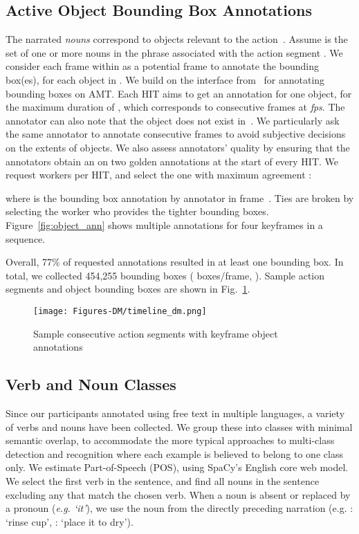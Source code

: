 \documentclass[runningheads]{llncs}
\newcommand{\fps}{\textit{fps}}
\begin{document}
\subsection{Active Object Bounding Box Annotations}
\label{subsec:strongObject}

The narrated \textit{nouns} correspond to objects relevant
to the action~\cite{Lee2012,Damen2014a}. Assume  is the set of one or more nouns in the phrase  associated with the action segment . We consider each frame  within  as a potential frame to annotate the bounding box(es), for each object in . We build on the interface from~\cite{tangseng2017} for annotating bounding boxes on AMT.
Each HIT aims to get an annotation for one object, for the maximum duration of , which corresponds to  consecutive frames at \fps. The annotator can also note that the object does not exist in~. 
We particularly ask the same annotator to annotate consecutive frames to avoid subjective decisions on the extents of objects. We also assess annotators' quality by ensuring that the annotators obtain an  on two golden annotations at the start of every HIT. We request  workers per HIT, and select the one with maximum agreement : 


\vspace*{-8pt}
\noindent where  is the  bounding box annotation by annotator  in frame~. Ties are broken by selecting the worker who provides the tighter bounding boxes. Figure~\ref{fig:object_ann} shows multiple annotations for four keyframes in a sequence. 

Overall, 77\% of requested annotations resulted in at least one bounding box.
In total, we collected 454,255 bounding boxes ( boxes/frame, ). Sample action segments and object bounding boxes are shown in Fig.~\ref{fig:timeline_example}.

\begin{figure}
\centering
\texttt{[image: Figures-DM/timeline\_dm.png]}
\caption{Sample consecutive action segments with keyframe object annotations}
\label{fig:timeline_example}
\end{figure}

\subsection{Verb and Noun Classes}
\label{subsec:clusters}


Since our participants annotated using free text in multiple languages, a variety of verbs and nouns have been collected. We group these into classes with minimal semantic overlap, to accommodate the more typical approaches to multi-class detection and recognition where each example is believed to belong to one class only. We estimate Part-of-Speech (POS), using SpaCy's English core web model. We select the first verb in the sentence, and find all nouns in the sentence excluding any that match the chosen verb.
When a noun is absent or replaced by a pronoun (\textit{e.g. `it'}), we use the noun from the directly preceding narration (e.g. : `rinse cup', : `place it to dry').
\end{document}
